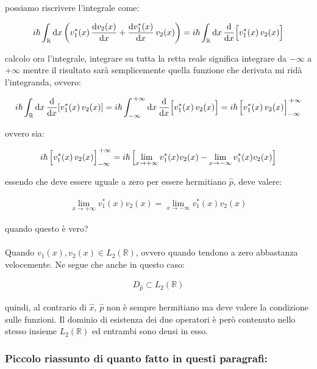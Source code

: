 	possiamo riscrivere l'integrale come:
	
\begin{align*}
	i\hbar  \int_{\mathbb{R}} \dd x \, \qty( v^*_1(x) \, \dv{v_2(x)}{x}   +    \dv{v^*_1(x)}{x} \, v_2(x) ) = i\hbar  \int_{\mathbb{R}} \dd x \, \dv{x} \qty\Big[ v_1^*(x)   \, v_2(x)  ]
\end{align*}

	calcolo ora l'integrale, integrare su tutta la retta reale significa integrare da $-\infty$ a $+\infty$ mentre il risultato sarà semplicemente quella funzione che derivata mi ridà l'integranda, ovvero:

\begin{align*}
	i\hbar  \int_{\mathbb{R}} \dd x \, \dv{x} \qty[ v_1^*(x)   \, v_2(x)  ] = i\hbar  \int_{-\infty}^{\, +\infty} \dd x \, \dv{x} \qty\Big[ v_1^*(x)   \, v_2(x)  ] = i\hbar \, \qty\Big[v_1^*(x)   \, v_2(x)]_{-\infty}^{\, +\infty}
\end{align*}

	ovvero sia:
	
\begin{align*}
	i\hbar \, \qty\Big[v_1^*(x)   \, v_2(x)]_{-\infty}^{\, +\infty} = i\hbar \,  \qty\Big[ \lim_{x\to+\infty} v_1^*(x) v_2(x)   -   \lim_{x\to-\infty}  v_1^*(x) v_2(x) ]
\end{align*}

	essendo che deve essere uguale a zero per essere hermitiano $\hat{p}$, deve valere:
	
\begin{align*}
	 \lim_{x\to+\infty} v_1^*(x) v_2(x) = \lim_{x\to-\infty}  v_1^*(x) v_2(x)
\end{align*}

	quando questo è vero?
	\\
	\\
	Quando $v_1(x), v_2(x) \in L_2(\mathbb{R})$, ovvero quando tendono a zero abbastanza velocemente. Ne segue che anche in questo caso:
	
\begin{align*}
	D_{\hat{p}} \subset L_2(\mathbb{R})
\end{align*}

	quindi, al contrario di $\hat{x}$, $\hat{p}$ non è sempre hermitiano ma deve valere la condizione sulle funzioni. Il dominio di esistenza dei due operatori è però contenuto nello stesso insieme $L_2(\mathbb{R})$ ed entrambi sono densi in esso.

\subsubsection{Piccolo riassunto di quanto fatto in questi paragrafi:}

